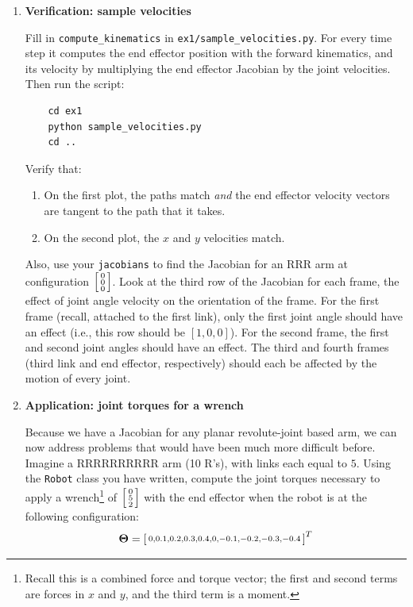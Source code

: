 \documentclass{16384_doc}
\begin{document}
\begin{questions}
\begin{enumerate}  [label=\alph*.]
        \item \text{[5 points]} \textbf{Verification: sample velocities}

        Fill in \verb!compute_kinematics! in \verb!ex1/sample_velocities.py!. For
        every time step it computes the end effector position with the forward
        kinematics, and its velocity by multiplying the end effector Jacobian by
        the joint velocities. Then run the script:

\begin{verbatim}
    cd ex1
    python sample_velocities.py
    cd ..
\end{verbatim}

        Verify that:
        \begin{enumerate}[label=(\roman*)]
            \item On the first plot, the paths match \emph{and} the end effector
                velocity vectors are tangent to the path that it takes.
            \item On the second plot, the $x$ and $y$ velocities match.
        \end{enumerate}

        Also, use your \verb!jacobians! to find the Jacobian for an RRR arm at
        configuration $\left[\begin{smallmatrix}0\\0\\0\end{smallmatrix}\right]$. Look at the third row of the Jacobian
        for each frame, the effect of joint angle velocity on the orientation of
        the frame. For the first frame (recall, attached to the first link), only
        the first joint angle should have an effect (i.e., this row should be
        $[1, 0, 0]$). For the second frame, the first and second joint angles
        should have an effect. The third and fourth frames (third link and end
        effector, respectively) should each be affected by the motion of every
        joint.

        \item \text{[5 points]} \textbf{Application: joint torques for a wrench}

        Because we have a Jacobian for any planar revolute-joint based arm, we
        can now address problems that would have been much more difficult
        before. Imagine a RRRRRRRRRR arm (10 R's), with links each equal to $5$.
        Using the \verb!Robot! class you have written, compute the joint torques
        necessary to apply a wrench\footnote{Recall this is a combined force and
        torque vector; the first and second terms are forces in $x$ and $y$, and
        the third term is a moment.} of $\left[\begin{smallmatrix}0\\5\\2\end{smallmatrix}\right]$ with the end
        effector when the robot is at the following configuration:
        \[
        \mathbf{\Theta} = \left[\begin{smallmatrix}0, 0.1, 0.2, 0.3, 0.4, 0, -0.1, -0.2, -0.3, -0.4\end{smallmatrix}\right]^T
        \]


\end{enumerate}
\end{questions}
\end{document}

